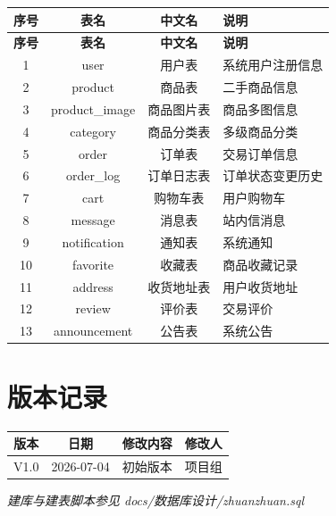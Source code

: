\documentclass[12pt,a4paper,UTF8]{ctexart}
\begin{document}
\begin{longtable}{|c|c|c|p{}|}
    \hline
    \textbf{序号} & \textbf{表名} & \textbf{中文名} & \textbf{说明} \\
    \hline
    \endfirsthead
    \hline
    \textbf{序号} & \textbf{表名} & \textbf{中文名} & \textbf{说明} \\
    \hline
    \endhead
    \hline
    \endfoot

    1 & user & 用户表 & 系统用户注册信息 \\
    \hline
    2 & product & 商品表 & 二手商品信息 \\
    \hline
    3 & product\_image & 商品图片表 & 商品多图信息 \\
    \hline
    4 & category & 商品分类表 & 多级商品分类 \\
    \hline
    5 & order & 订单表 & 交易订单信息 \\
    \hline
    6 & order\_log & 订单日志表 & 订单状态变更历史 \\
    \hline
    7 & cart & 购物车表 & 用户购物车 \\
    \hline
    8 & message & 消息表 & 站内信消息 \\
    \hline
    9 & notification & 通知表 & 系统通知 \\
    \hline
    10 & favorite & 收藏表 & 商品收藏记录 \\
    \hline
    11 & address & 收货地址表 & 用户收货地址 \\
    \hline
    12 & review & 评价表 & 交易评价 \\
    \hline
    13 & announcement & 公告表 & 系统公告 \\
    \hline
\end{longtable}

\section{版本记录}

\begin{longtable}{|c|c|c|c|}
    \hline
    \textbf{版本} & \textbf{日期} & \textbf{修改内容} & \textbf{修改人} \\
    \hline
    V1.0 & 2026-07-04 & 初始版本 & 项目组 \\
    \hline
\end{longtable}

\vfill
\begin{center}
    \textit{建库与建表脚本参见 docs/数据库设计/zhuanzhuan.sql}
\end{center}
\end{document}
